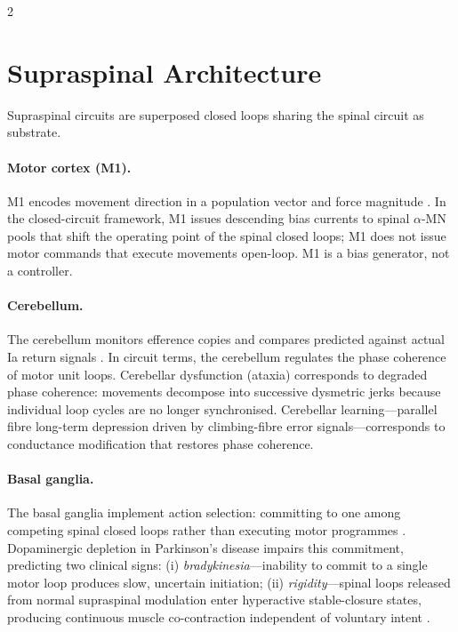 \begin{multicols}{2}
\section{Supraspinal Architecture}
\label{sec:ch06-supraspinal}

Supraspinal circuits are superposed closed loops sharing the spinal circuit
as substrate.

\paragraph{Motor cortex (M1).}
M1 encodes movement direction in a population vector \citep{georgopoulos1986}
and force magnitude \citep{evarts1968}.  In the closed-circuit framework, M1
issues descending bias currents to spinal $\alpha$-MN pools that shift the
operating point of the spinal closed loops; M1 does not issue motor commands
that execute movements open-loop.  M1 is a bias generator, not a controller.

\paragraph{Cerebellum.}
The cerebellum monitors efference copies and compares predicted against actual
Ia return signals \citep{thach1992,ivry1989}.  In circuit terms, the
cerebellum regulates the phase coherence of motor unit loops.  Cerebellar
dysfunction (ataxia) corresponds to degraded phase coherence: movements
decompose into successive dysmetric jerks because individual loop cycles are
no longer synchronised.  Cerebellar learning---parallel fibre long-term
depression driven by climbing-fibre error signals---corresponds to conductance
modification that restores phase coherence.

\paragraph{Basal ganglia.}
The basal ganglia implement action selection: committing to one among
competing spinal closed loops rather than executing motor programmes
\citep{redgrave1999,graybiel2005}.  Dopaminergic depletion in Parkinson's
disease impairs this commitment, predicting two clinical signs: (i)
\emph{bradykinesia}---inability to commit to a single motor loop produces
slow, uncertain initiation; (ii) \emph{rigidity}---spinal loops released from
normal supraspinal modulation enter hyperactive stable-closure states,
producing continuous muscle co-contraction independent of voluntary intent
\citep{hallett1993}.


\end{multicols}
